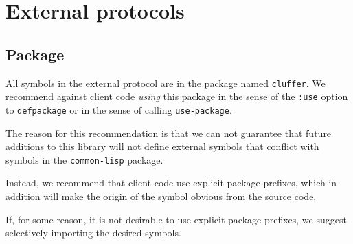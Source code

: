 \chapter{External protocols}

\section{Package}

All symbols in the external protocol are in the package named
\texttt{cluffer}.  We recommend against client code \emph{using} this
package in the sense of the \texttt{:use} option to
\texttt{defpackage} or in the sense of calling \texttt{use-package}.

The reason for this recommendation is that we can not guarantee that
future additions to this library will not define external symbols that
conflict with symbols in the \texttt{common-lisp} package.

Instead, we recommend that client code use explicit package prefixes,
which in addition will make the origin of the symbol obvious from the
source code.

If, for some reason, it is not desirable to use explicit package
prefixes, we suggest selectively importing the desired symbols.


